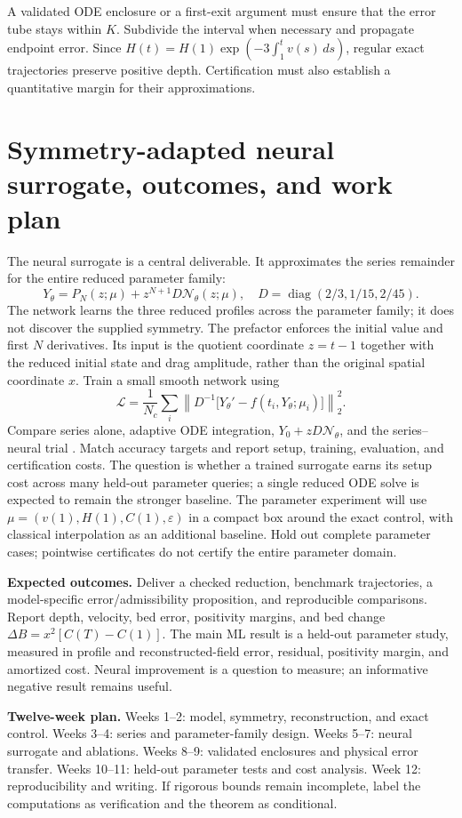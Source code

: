 \documentclass[12pt,a4paper]{article}
\begin{document}
A validated ODE enclosure or a first-exit argument must ensure that the error tube stays within $K$. Subdivide the interval when necessary and propagate endpoint error. Since $H(t)=H(1)\exp(-3\int_1^t v(s)\,ds)$, regular exact trajectories preserve positive depth. Certification must also establish a quantitative margin for their approximations.
\newpage
\section{Symmetry-adapted neural surrogate, outcomes, and work plan}
The neural surrogate is a central deliverable. It approximates the series remainder for the entire reduced parameter family:
\[
Y_\theta=P_N(z;\mu)+z^{N+1}D\mathcal N_\theta(z;\mu),\quad
D=\operatorname{diag}(2/3,1/15,2/45).
\]
The network learns the three reduced profiles across the parameter family; it does not discover the supplied symmetry. The prefactor enforces the initial value and first $N$ derivatives. Its input is the quotient coordinate $z=t-1$ together with the reduced initial state and drag amplitude, rather than the original spatial coordinate $x$. Train a small smooth network using
\[
\mathcal L=\frac1{N_c}\sum_i
\left\|D^{-1}\big[Y_\theta'-f(t_i,Y_\theta;\mu_i)\big]\right\|_2^2.
\]
Compare series alone, adaptive ODE integration, $Y_0+zD\mathcal N_\theta$, and the series--neural trial \cite{taylor,lagaris}. Match accuracy targets and report setup, training, evaluation, and certification costs. The question is whether a trained surrogate earns its setup cost across many held-out parameter queries; a single reduced ODE solve is expected to remain the stronger baseline. The parameter experiment will use $\mu=(v(1),H(1),C(1),\varepsilon)$ in a compact box around the exact control, with classical interpolation as an additional baseline. Hold out complete parameter cases; pointwise certificates do not certify the entire parameter domain.

\textbf{Expected outcomes.} Deliver a checked reduction, benchmark trajectories, a model-specific error/admissibility proposition, and reproducible comparisons. Report depth, velocity, bed error, positivity margins, and bed change $\Delta B=x^2[C(T)-C(1)]$. The main ML result is a held-out parameter study, measured in profile and reconstructed-field error, residual, positivity margin, and amortized cost. Neural improvement is a question to measure; an informative negative result remains useful.

\textbf{Twelve-week plan.} Weeks 1--2: model, symmetry, reconstruction, and exact control. Weeks 3--4: series and parameter-family design. Weeks 5--7: neural surrogate and ablations. Weeks 8--9: validated enclosures and physical error transfer. Weeks 10--11: held-out parameter tests and cost analysis. Week 12: reproducibility and writing. If rigorous bounds remain incomplete, label the computations as verification and the theorem as conditional.
\end{document}
